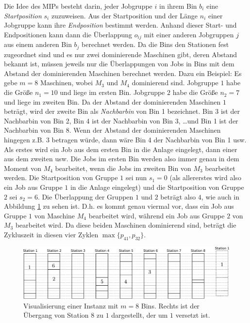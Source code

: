 \documentclass{scrreprt}
\begin{document}
Die Idee des MIPs besteht darin, jeder Jobgruppe $i$ in ihrem Bin $b_i$ eine \textit{Startposition} $s_i$ zuzuweisen.
Aus der Startposition und der Länge $n_i$ einer Jobgruppe kann ihre \textit{Endposition} bestimmt werden.
Anhand dieser Start- und Endpositionen kann dann die Überlappung $o_{ij}$ mit einer anderen Jobgruppen $j$ aus einem anderen Bin $b_j$
berechnet werden.
Da die Bins den Stationen fest zugeordnet sind und es nur zwei dominierende Maschinen gibt, deren Abstand bekannt ist, 
müssen jeweils nur die Überlappungen von Jobs in Bins mit dem Abstand der dominierenden Maschinen berechnet werden.
Dazu ein Beispiel: Es gebe $m=8$ Maschinen, wobei $M_3$ und $M_4$ dominierend sind. 
Jobgruppe $1$ habe die Größe $n_1=10$ und liege im ersten Bin.
Jobgruppe $2$ habe die Größe $n_2=7$ und liege im zweiten Bin.
Da der Abstand der dominierenden Maschinen $1$ beträgt, wird der zweite Bin als \textit{Nachbarbin} von Bin 1 bezeichnet.
Bin 3 ist der Nachbarbin von Bin 2, Bin 4 ist der Nachbarbin von Bin 3, \ldots und Bin 1 ist der Nachbarbin von Bin 8.
Wenn der Abstand der dominierenden Maschinen hingegen z.B. $3$ betragen würde, dann wäre Bin 4 der Nachbarbin von Bin 1 usw.
Als erstes wird ein Job aus dem ersten Bin in die Anlage eingelegt, dann einer aus dem zweiten usw. 
Die Jobs im ersten Bin werden also immer genau in dem Moment von $M_4$ bearbeitet, wenn die Jobs im zweiten Bin von $M_3$ bearbeitet werden.
Die Startposition von Gruppe $1$ sei nun $s_1=0$ (als allererstes wird also ein Job aus Gruppe $1$ in die Anlage eingelegt)
und die Startposition von Gruppe $2$ sei $s_2=6$.
Die Überlappung der Gruppen $1$ und $2$ beträgt also $4$, wie auch in Abbildung \ref{abb:binfixbsp} zu sehen ist.
D.h. es kommt genau viermal vor, dass ein Job aus Gruppe $1$ von Maschine $M_4$ bearbeitet wird, während ein Job aus Gruppe $2$ von $M_3$ bearbeitet wird.
Da diese beiden Maschinen dominierend sind, beträgt die Zykluszeit in diesen vier Zyklen $\max\{p_{41},p_{32}\}$.
\begin{figure}
    \begin{center}
        \includegraphics[width=\textwidth]{graphics/binfixbsp.pdf}
    \end{center}
    \caption{
        \label{abb:binfixbsp}
        Visualisierung einer Instanz mit $m=8$ Bins. 
        Rechts ist der Übergang von Station $8$ zu $1$ dargestellt, der um $1$ versetzt ist.
    }
\end{figure}
\end{document}
